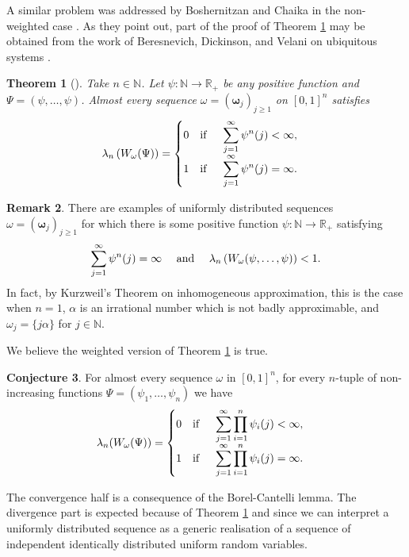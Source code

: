 \documentclass{amsart}
\newtheorem{theorem}{Theorem}[section]
\theoremstyle{definition}
\newtheorem{remark}[theorem]{Remark}
\newtheorem{conjecture}[theorem]{Conjecture}
\newcommand{\N}{\mathbb N}%
\newcommand{\R}{\mathbb R}
\newcommand{\0}{\mbf 0}%
\renewcommand{\text}{\textup}
\def\N{\mathbb N}
\def\R{\mathbb R}
\begin{document}
A similar problem was addressed by Boshernitzan and Chaika in the non-weighted case \cite[Example 8]{BoshernitzanChaika2012}. As they point out, part of the proof of Theorem \ref{TEO:BoshChai} may be obtained from the work of Beresnevich, Dickinson, and Velani on ubiquitous systems \cite{BDV06}. 

\begin{theorem}[{{\cite[Example 1]{BoshernitzanChaika2012}}}]\label{TEO:BoshChai}
    Take $n\in\N$. Let $\psi:\N\to\R_+$ be any positive function and $\Psi=(\psi,\ldots, \psi)$. Almost every sequence $\omega = (\boldsymbol{\omega}_j)_{j\geq 1}$ on $[0,1]^n$ satisfies
    \[
    \lambda_n\left( W_{\omega}(\Psi)  \right)
    =
    \begin{cases}
        0 \quad \text{\rm if } \quad \displaystyle\sum_{j=1}^{\infty} \psi^n(j)<\infty, \\
        1 \quad \text{\rm if } \quad \displaystyle\sum_{j=1}^{\infty} \psi^n(j)=\infty. 
    \end{cases}    
    \]
\end{theorem}
\begin{remark}
There are examples of uniformly distributed sequences $\omega=(\boldsymbol{\omega}_j)_{j\geq 1}$ for which there is some positive function $\psi:\N\to\R_+$ satisfying
\[
\sum_{j=1}^{\infty} \psi^n(j)=\infty
\quad\text{ and }\quad
\lambda_n\left( W_{\omega}(\psi, \ldots, \psi) \right)< 1.
\]
In fact, by Kurzweil's Theorem on inhomogeneous approximation, this is the case when $n=1$, $\alpha$ is an irrational number which is not badly approximable, and $\omega_j=\{j\alpha\}$ for $j\in\N$. 
\end{remark}
We believe the weighted version of Theorem \ref{TEO:BoshChai} is true.
\begin{conjecture}
    For almost every sequence $\omega$ in $[0,1]^n$, for every $n$-tuple of non-increasing functions $\Psi=(\psi_1,\ldots, \psi_n)$ we have
    \[
    \lambda_n(W_{\omega}(\Psi))
    =
    \begin{cases}
        0 \quad \text{\rm if } \quad \displaystyle\sum_{j=1}^{\infty} \prod_{i=1}^n \psi_i(j) < \infty, \\ 
        1 \quad \text{\rm if } \quad \displaystyle\sum_{j=1}^{\infty} \prod_{i=1}^n \psi_i(j) = \infty. \\ 
    \end{cases}
    \]
\end{conjecture}
The convergence half is a consequence of the Borel-Cantelli lemma. The divergence part is expected because of Theorem \ref{TEO:BoshChai} and since we can interpret a uniformly distributed sequence as a generic realisation of a sequence of independent identically distributed uniform random variables.
\end{document}
